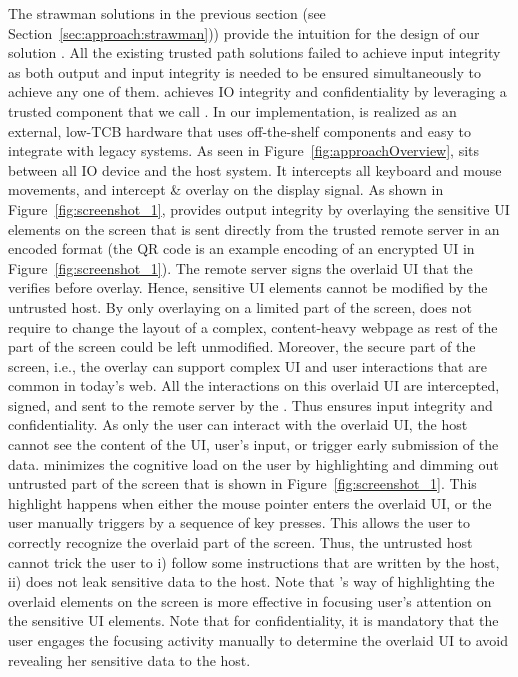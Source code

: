  The strawman solutions in the previous section (see Section~\ref{sec:approach:strawman})) provide the intuition for the design of our solution \name. All the existing trusted path solutions failed to achieve input integrity as both output and input integrity is needed to be ensured simultaneously to achieve any one of them. \name achieves IO integrity and confidentiality by leveraging a trusted component that we call \device. In our implementation, \device is realized as an external, low-TCB hardware that uses off-the-shelf components and easy to integrate with legacy systems. As seen in Figure~\ref{fig:approachOverview}, \device sits between all IO device and the host system. It intercepts all keyboard and mouse movements, and intercept \& overlay on the display signal. As shown in Figure~\ref{fig:screenshot_1}, \name provides output integrity by overlaying the sensitive UI elements on the screen that is sent directly from the trusted remote server in an encoded format (the QR code is an example encoding of an encrypted UI in Figure~\ref{fig:screenshot_1}). The remote server signs the overlaid UI that the \device verifies before overlay. Hence, sensitive UI elements cannot be modified by the untrusted host. By only overlaying on a limited part of the screen, \name does not require to change the layout of a complex, content-heavy webpage as rest of the part of the screen could be left unmodified.
Moreover, the secure part of the screen, i.e., the overlay can support complex UI and user interactions that are common in today's web. All the interactions on this overlaid UI are intercepted, signed, and sent to the remote server by the \device. Thus \name ensures input integrity and confidentiality. As only the user can interact with the overlaid UI, the host cannot see the content of the UI, user's input, or trigger early submission of the data.
\name minimizes the cognitive load on the user by highlighting and dimming out untrusted part of the screen that is shown in Figure~\ref{fig:screenshot_1}. This highlight happens when either the mouse pointer enters the overlaid UI, or the user manually triggers by a sequence of key presses. This allows the user to correctly recognize the overlaid part of the screen. Thus, the untrusted host cannot trick the user to i) follow some instructions that are written by the host, ii) does not leak sensitive data to the host. Note that \name's way of highlighting the overlaid elements on the screen is more effective in focusing user's attention on the sensitive UI elements. Note that for confidentiality, it is mandatory that the user engages the focusing activity manually to determine the overlaid UI to avoid revealing her sensitive data to the host. 
